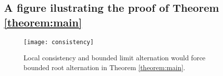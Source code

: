 \subsection*{A figure ilustrating the proof of Theorem \ref{theorem:main}}
\begin{figure}
\begin{center}
\texttt{[image: consistency]}
\caption{Local consistency and bounded limit alternation would force bounded root alternation in Theorem \ref{theorem:main}. 
\label{figure:consistency}} 
\end{center}
\end{figure}

